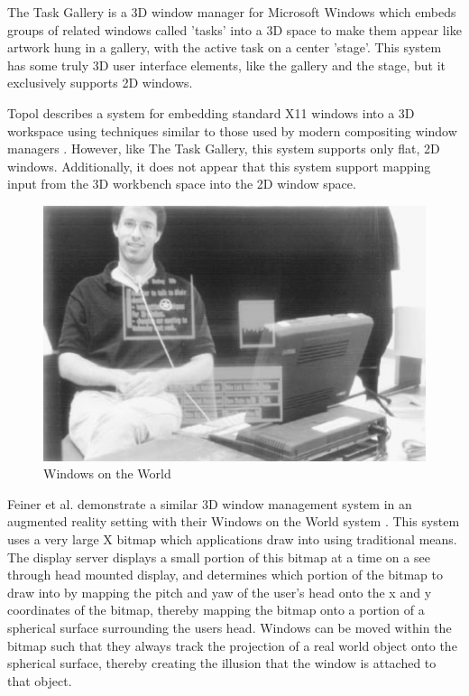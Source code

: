 The Task Gallery \cite{task_gallery} is a 3D window manager for Microsoft Windows which embeds groups of related windows called 'tasks' into a 3D space to make them appear like artwork hung in a gallery, with the active task on a center 'stage'. This system has some truly 3D user interface elements, like the gallery and the stage, but it exclusively supports 2D windows. 


Topol describes a system for embedding standard X11 windows into a 3D workspace using techniques similar to those used by modern compositing window managers \cite{xwindow_immersion}. However, like The Task Gallery, this system supports only flat, 2D windows. Additionally, it does not appear that this system support mapping input from the 3D workbench space into the 2D window space.

\begin{figure}[ht!]
\centering
\includegraphics[width=1.0\textwidth]{images/wotw.png}
\caption{Windows on the World \protect\cite{wotw}}
\end{figure}

Feiner et al. demonstrate a similar 3D window management system in an augmented reality setting with their Windows on the World system \cite{wotw}. This system uses a very large X bitmap which applications draw into using traditional means. The display server displays a small portion of this bitmap at a time on a see through head mounted display, and determines which portion of the bitmap to draw into by mapping the pitch and yaw of the user's head onto the x and y coordinates of the bitmap, thereby mapping the bitmap onto a portion of a spherical surface surrounding the users head. Windows can be moved within the bitmap such that they always track the projection of a real world object onto the spherical surface, thereby creating the illusion that the window is attached to that object.
 

